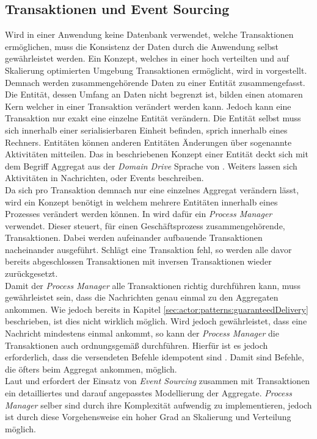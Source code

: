 \subsection{Transaktionen und Event Sourcing}
Wird in einer Anwendung keine Datenbank verwendet, welche Transaktionen ermöglichen, muss die Konsistenz der Daten durch die Anwendung selbst gewährleistet werden. Ein Konzept, welches in einer hoch verteilten und auf Skalierung optimierten Umgebung Transaktionen ermöglicht, wird in \cite{helland2007life} vorgestellt. Demnach werden zusammengehörende Daten zu einer Entität zusammengefasst. Die Entität, dessen Umfang an Daten nicht begrenzt ist, bilden einen atomaren Kern welcher in einer Transaktion verändert werden kann. Jedoch kann eine Transaktion nur exakt eine einzelne Entität verändern. Die Entität selbst muss sich innerhalb einer serialisierbaren Einheit befinden, sprich innerhalb eines Rechners. Entitäten können anderen Entitäten Änderungen über sogenannte Aktivitäten mitteilen. Das in \cite{helland2007life} beschriebenen Konzept einer Entität deckt sich mit dem Begriff Aggregat aus der \textit{Domain Drive} Sprache von \cite{Evans2004Domain-drivenSoftware}. Weiters lassen sich Aktivitäten in Nachrichten, oder Events beschreiben. \\
%
%
Da sich pro Transaktion demnach nur eine einzelnes Aggregat verändern lässt, wird ein Konzept benötigt in welchem mehrere Entitäten innerhalb eines Prozesses verändert werden können. In \cite{betts2013CQRSEventSourcing} wird dafür ein \textit{Process Manager} verwendet. Dieser steuert, für einen Geschäftsprozess zusammengehörende, Transaktionen. Dabei werden aufeinander aufbauende Transaktionen nacheinander ausgeführt. Schlägt eine Transaktion fehl, so werden alle davor bereits abgeschlossen Transaktionen mit inversen Transaktionen wieder zurückgesetzt. \\
Damit der \textit{Process Manager} alle Transaktionen richtig durchführen kann, muss gewährleistet sein, dass die Nachrichten genau einmal zu den Aggregaten ankommen. Wie jedoch bereits in Kapitel \ref{sec:actor:patterns:guaranteedDelivery} beschrieben, ist dies nicht wirklich möglich. Wird jedoch gewährleistet, dass eine Nachricht mindestens einmal ankommt, so kann der \textit{Process Manager} die Transaktionen auch ordnungsgemäß durchführen. Hierfür ist es jedoch erforderlich, dass die versendeten Befehle idempotent sind \citep{betts2013CQRSEventSourcing}. Damit sind Befehle, die öfters beim Aggregat ankommen, möglich. \\
Laut \cite{betts2013CQRSEventSourcing} und \cite{vernon2013implementing} erfordert der Einsatz von \textit{Event Sourcing} zusammen mit  Transaktionen ein detailliertes und darauf angepasstes Modellierung der Aggregate. \textit{Process Manager} selber sind durch ihre Komplexität aufwendig zu implementieren, jedoch ist durch diese Vorgehensweise ein hoher Grad an Skalierung und Verteilung möglich. \cite{helland2007life}